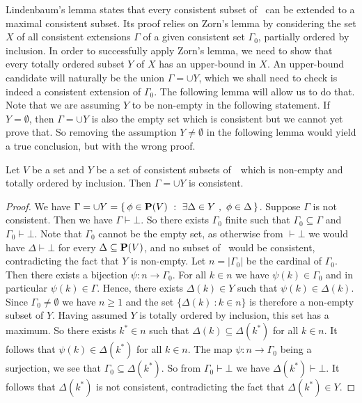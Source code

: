 Lindenbaum's lemma states that every consistent subset of \pv\ can
be extended to a maximal consistent subset. Its proof relies on
Zorn's lemma by considering the set $X$ of all consistent extensions
$\Gamma$ of a given consistent set $\Gamma_{0}$, partially ordered
by inclusion. In order to successfully apply Zorn's lemma, we need
to show that every totally ordered subset $Y$ of $X$ has an
upper-bound in $X$. An upper-bound candidate will naturally be the
union $\Gamma=\cup Y$, which we shall need to check is indeed a
consistent extension of $\Gamma_{0}$. The following lemma will allow
us to do that. Note that we are assuming $Y$ to be non-empty in the
following statement. If $Y=\emptyset$, then $\Gamma=\cup Y$ is also
the empty set which is consistent but we cannot yet prove that. So
removing the assumption $Y\neq\emptyset$ in the following lemma
would yield a true conclusion, but with the wrong proof.

\begin{lemma}\label{logic:lemma:FOPL:semantics:chain:consistent}
Let $V$ be a set and $Y$ be a set of consistent subsets of\, \pv\
which is non-empty and totally ordered by inclusion. Then
$\Gamma=\cup Y$ is consistent.
\end{lemma}
\begin{proof}
We have $\Gamma=\cup Y=\{\,\phi\in\mbox{${\bf P}(V)$}\ :\ \exists\Delta\in Y\ ,\
\phi\in\Delta\,\}$. Suppose $\Gamma$ is not consistent. Then we have
$\Gamma\vdash\bot$. So there exists $\Gamma_{0}$ finite such that
$\Gamma_{0}\subseteq\Gamma$ and $\Gamma_{0}\vdash\bot$. Note that
$\Gamma_{0}$ cannot be the empty set, as otherwise from $\vdash\bot$
we would have $\Delta\vdash\bot$ for every $\Delta\subseteq\mbox{${\bf P}(V)$}$, and
no subset of \pv\ would be consistent, contradicting the fact that
$Y$ is non-empty. Let $n=|\Gamma_{0}|$ be the cardinal of
$\Gamma_{0}$. Then there exists a bijection $\psi:n\to\Gamma_{0}$.
For all $k\in n$ we have $\psi(k)\in\Gamma_{0}$ and in particular
$\psi(k)\in\Gamma$. Hence, there exists $\Delta(k)\in Y$ such that
$\psi(k)\in\Delta(k)$. Since $\Gamma_{0}\neq\emptyset$ we have
$n\geq 1$ and the set $\{\Delta(k)\ : k\in n\}$ is therefore a
non-empty subset of $Y$. Having assumed $Y$ is totally ordered by
inclusion, this set has a maximum. So there exists $k^{*}\in n$ such
that $\Delta(k)\subseteq\Delta(k^{*})$ for all $k\in n$. It follows
that $\psi(k)\in\Delta(k^{*})$ for all $k\in n$. The map
$\psi:n\to\Gamma_{0}$ being a surjection, we see that
$\Gamma_{0}\subseteq\Delta(k^{*})$. So from $\Gamma_{0}\vdash\bot$
we have $\Delta(k^{*})\vdash\bot$. It follows that $\Delta(k^{*})$
is not consistent, contradicting the fact that $\Delta(k^{*})\in Y$.
\end{proof}

